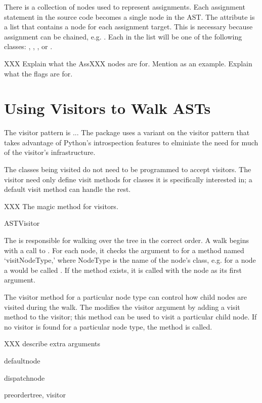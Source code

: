 \documentclass{manual}
\begin{document}
There is a collection of nodes used to represent assignments.  Each
assignment statement in the source code becomes a single
 node in the AST.  The  attribute is a
list that contains a node for each assignment target.  This is
necessary because assignment can be chained, e.g. .
Each  in the list will be one of the following classes: 
, , , or
. 

XXX Explain what the AssXXX nodes are for.  Mention 
as an example.  Explain what the flags are for.

\chapter{Using Visitors to Walk ASTs}

The visitor pattern is ...  The  package uses a
variant on the visitor pattern that takes advantage of Python's
introspection features to elminiate the need for much of the visitor's
infrastructure.

The classes being visited do not need to be programmed to accept
visitors.  The visitor need only define visit methods for classes it
is specifically interested in; a default visit method can handle the
rest. 

XXX The magic  method for visitors.

\begin{classdesc}{ASTVisitor}{}

The  is responsible for walking over the tree in the
correct order.  A walk begins with a call to .  For
each node, it checks the  argument to 
for a method named `visitNodeType,' where NodeType is the name of the
node's class, e.g. for a  node a 
would be called .  If the method exists, it is called with the node as
its first argument.

The visitor method for a particular node type can control how child
nodes are visited during the walk.  The  modifies
the visitor argument by adding a visit method to the visitor; this
method can be used to visit a particular child node.  If no visitor is
found for a particular node type, the  method is
called. 

XXX describe extra arguments

\begin{methoddesc}{default}{node}
\end{methoddesc}

\begin{methoddesc}{dispatch}{node}
\end{methoddesc}

\begin{methoddesc}{preorder}{tree, visitor}
\end{methoddesc}

\end{classdesc}
\end{document}
